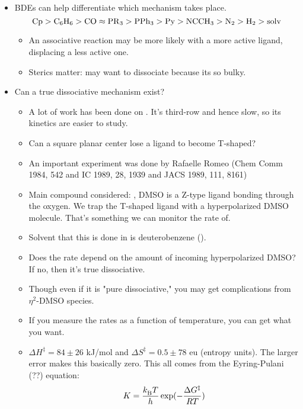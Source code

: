 \documentclass[../notes.tex]{subfiles}
\begin{document}
\begin{itemize}
    \item BDEs can help differentiate which mechanism takes place.
    \begin{equation*}
        \ce{Cp}
        > \ce{C6H6}
        > \ce{CO}
        \approx \ce{PR3}
        > \ce{PPh3}
        > \ce{Py}
        > \ce{NCCH3}
        > \ce{N2}
        > \ce{H2}
        > \text{solv}
    \end{equation*}
    \begin{itemize}
        \item An associative reaction may be more likely with a more active ligand, displacing a less active one.
        \item Sterics matter:  may want to dissociate because its so bulky.
    \end{itemize}
    \item Can a true dissociative mechanism exist?
    \begin{itemize}
        \item A lot of work has been done on . It's third-row and hence slow, so its kinetics are easier to study.
        \item Can a square planar  center lose a ligand to become T-shaped?
        \item An important experiment was done by Rafaelle Romeo (Chem Comm 1984, 542 and IC 1989, 28, 1939 and JACS 1989, 111, 8161)
        \item Main compound considered: , DMSO is a Z-type ligand bonding through the oxygen. We trap the T-shaped ligand with a hyperpolarized DMSO molecule. That's something we can monitor the rate of.
        \item Solvent that this is done in is deuterobenzene ().
        \item Does the rate depend on the amount of incoming hyperpolarized DMSO? If no, then it's true dissociative.
        \item Though even if it is "pure dissociative," you may get complications from $\eta^2$-DMSO species.
        \item If you measure the rates as a function of temperature, you can get what you want.
        \item $\Delta H^\ddagger=84\pm 26$ kJ/mol and $\Delta S^\ddagger=0.5\pm 78$ eu (entropy units). The larger error makes this basically zero. This all comes from the Eyring-Pulani (??) equation:
        \begin{equation*}
            K = \frac{\kB T}{h}\exp(-\frac{\Delta G^\ddagger}{RT})

\end{equation*}
\end{itemize}
\end{itemize}
\end{document}
